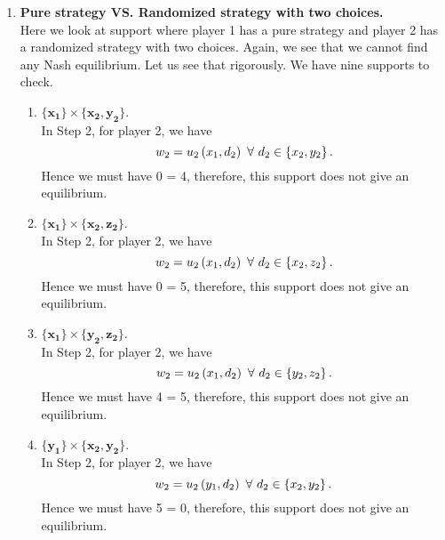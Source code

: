 \begin{enumerate} [label=\Alph*. ]
\begin{enumerate} [label*= (\arabic*)]
	\item The support $\mathbf{\{y_1\}} \times \mathbf{\{z_2\}}$ does not give an equilibrium, therefore the support $\mathbf{\{z_1\}} \times \mathbf{\{y_2\}}$ will not give an equilibrium either.
\end{enumerate}

\item \textbf{Pure strategy VS. Randomized strategy with two choices.} \\
Here we look at support where player 1 has a pure strategy and player 2 has a randomized strategy with two choices. Again, we see that we cannot find any Nash equilibrium. Let us see that rigorously. We have nine supports to check.

\begin{enumerate} [label*= (\arabic*)]
    \item $\mathbf{\{x_1\}} \times \mathbf{\{x_2, y_2\}}$. \\
        In Step 2, for player 2, we have
        \begin{equation*}
            w_2 = u_2 \left(x_1, d_2\right) \ \forall \ d_2 \in \left\{x_2, y_2\right\}.
        \end{equation*}
        Hence we must have 0 = 4, therefore, this support does not give an equilibrium.
        
    \item $\mathbf{\{x_1\}} \times \mathbf{\{x_2, z_2\}}$. \\
        In Step 2, for player 2, we have
        \begin{equation*}
            w_2 = u_2 \left(x_1, d_2\right) \ \forall \ d_2 \in \left\{x_2, z_2\right\}.
        \end{equation*}
        Hence we must have 0 = 5, therefore, this support does not give an equilibrium.
        
    \item $\mathbf{\{x_1\}} \times \mathbf{\{y_2, z_2\}}$. \\
        In Step 2, for player 2, we have
        \begin{equation*}
            w_2 = u_2 \left(x_1, d_2\right) \ \forall \ d_2 \in \left\{y_2, z_2\right\}.
        \end{equation*}
        Hence we must have 4 = 5, therefore, this support does not give an equilibrium.
        
    \item $\mathbf{\{y_1\}} \times \mathbf{\{x_2, y_2\}}$. \\
        In Step 2, for player 2, we have
        \begin{equation*}
            w_2 = u_2 \left(y_1, d_2\right) \ \forall \ d_2 \in \left\{x_2, y_2\right\}.
        \end{equation*}
        Hence we must have 5 = 0, therefore, this support does not give an equilibrium.
        

\end{enumerate}
\end{enumerate}
